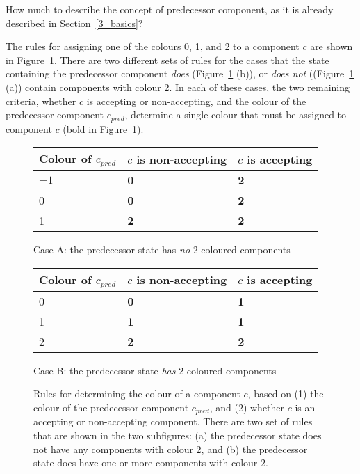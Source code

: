 How much to describe the concept of predecessor component, as it is already described in Section~\ref{3_basics}?

The rules for assigning one of the colours 0, 1, and 2 to a component $c$ are shown in Figure~\ref{colour_rules}. There are two different sets of rules for the cases that the state containing the predecessor component \textit{does} (Figure~\ref{colour_rules} (b)), or \textit{does not} ((Figure~\ref{colour_rules} (a)) contain components with colour 2. In each of these cases, the two remaining criteria, whether $c$ is accepting or non-accepting, and the colour of the predecessor component $c_{pred}$, determine a single colour that must be assigned to component $c$ (bold in Figure~\ref{colour_rules}). 

\begin{figure}[htb]
\centering
  \begin{subtable}[t]{\textwidth}
  \renewcommand{\arraystretch}{1.3}
  \centering
  \begin{tabular}{|C{3cm}|C{3cm}|C{3cm}|}
    \hline
    Colour of $c_{pred}$ & $c$ is non-accepting & $c$ is accepting \\
    \hline
    $-1$ & \textbf{0} & \textbf{2} \\
    0 & \textbf{0} & \textbf{2} \\
    1 & \textbf{2} & \textbf{2} \\
    \hline
  \end{tabular}
  \caption{Case A: the predecessor state has \textit{no} 2-coloured components}
  \end{subtable}
  \vskip0.5cm

  \begin{subtable}[t]{\textwidth}
  \renewcommand{\arraystretch}{1.3}
  \centering
  \begin{tabular}{|C{3cm}|C{3cm}|C{3cm}|}
    \hline
    Colour of $c_{pred}$ & $c$ is non-accepting & $c$ is accepting \\
     & \textbf{0} & \textbf{1} \\
    1 & \textbf{1} & \textbf{1} \\
    2 & \textbf{2} & \textbf{2} \\
    \hline
  \end{tabular}
  \caption{Case B: the predecessor state \textit{has} 2-coloured components}
  \end{subtable}
\caption{Rules for determining the colour of a component $c$, based on (1) the colour of the predecessor component $c_{pred}$, and (2) whether $c$ is an accepting or non-accepting component. There are two set of rules that are shown in the two subfigures: (a) the predecessor state does not have any components with colour 2, and (b) the predecessor state does have one or more components with colour 2.}
\label{colour_rules}
\end{figure}

